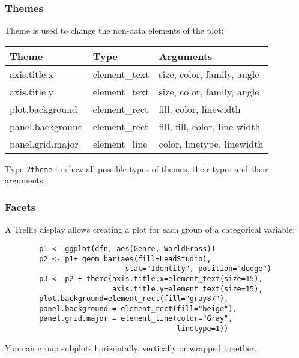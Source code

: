 \documentclass{beamer}
\begin{document}
	\begin{frame}[fragile]
		\frametitle{Themes}

		Theme is used to change the non-data elements of the plot:

		\begin{center}
		\begin{tabular}{|l|l|l|}
		\hline
    		Theme & Type & Arguments \\ 
		\hline
		axis.title.x & element\_text & size, color, family, angle \\
		\hline
		axis.title.y & element\_text & size, color, family, angle \\
		\hline
		plot.background & element\_rect & fill, color, linewidth \\
		\hline
		panel.background & element\_rect & fill, fill, color, line width \\
		\hline
		panel.grid.major & element\_line & color, linetype, linewidth \\
		\hline
		\end{tabular}
		\end{center}

		Type \verb|?theme| to show all possible types of themes, their types and their arguments.

	\end{frame}

	\begin{frame}[fragile]
		\frametitle{Facets}

		A Trellis display allows creating a plot for each group of a categorical variable:

		\begin{exampleblock}{}
		\begin{center}
		\begin{BVerbatim}
		p1 <- ggplot(dfn, aes(Genre, WorldGross)) 
		p2 <- p1+ geom_bar(aes(fill=LeadStudio), 
		                    stat="Identity", position="dodge")
		p3 <- p2 + theme(axis.title.x=element_text(size=15),
		                 axis.title.y=element_text(size=15),
		plot.background=element_rect(fill="gray87"),
		panel.background = element_rect(fill="beige"),
		panel.grid.major = element_line(color="Gray",
		                                linetype=1))
		\end{BVerbatim}
		\end{center}
		\end{exampleblock}{}

		You can group subplots horizontally, vertically or wrapped together.

	\end{frame}
	
\end{document}
